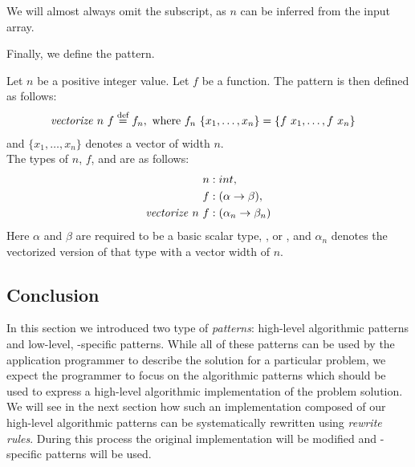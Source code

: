 We will almost always omit the subscript, as $n$ can be inferred from the input array.

\noindent
Finally, we define the \vect pattern.
\begin{definition}
  \label{definition:pattern:vect}
  Let $n$ be a positive integer value.
  Let $f$ be a function.
  The \vect pattern is then defined as follows:
  \begin{align*}
    \text{\textit{vectorize}}\ n\ f &\stackrel{\textrm{\scriptsize def}}{=} f_n, \text{ where } f_n\ \{x_1, \ldots, x_n\} = \{f\ x_1, \ldots, f\ x_n \}
  \end{align*}
  and $\{x_1,\ldots,x_n\}$ denotes a vector of width $n$.\\
  The types of $n$, $f$, and \vect are as follows:
  \begin{align*}
    n &: int,\\
    f &: (\alpha \rightarrow \beta),\\
    \text{\textit{vectorize}}\ n\ f &: (\alpha_n \rightarrow \beta_n)
  \end{align*}
  Here $\alpha$ and $\beta$ are required to be a basic scalar type, \eg,  or , and $\alpha_n$ denotes the vectorized version of that type with a vector width of $n$.
\end{definition}

\subsection{Conclusion}
In this section we introduced two type of \emph{patterns}:
high-level algorithmic patterns and low-level, \OpenCL-specific patterns.
While all of these patterns can be used by the application programmer to describe the solution for a particular problem, we expect the programmer to focus on the algorithmic patterns which should be used to express a high-level algorithmic implementation of the problem solution.
We will see in the next section how such an implementation composed of our high-level algorithmic patterns can be systematically rewritten using \emph{rewrite rules}.
During this process the original implementation will be modified and \OpenCL-specific patterns will be used.


